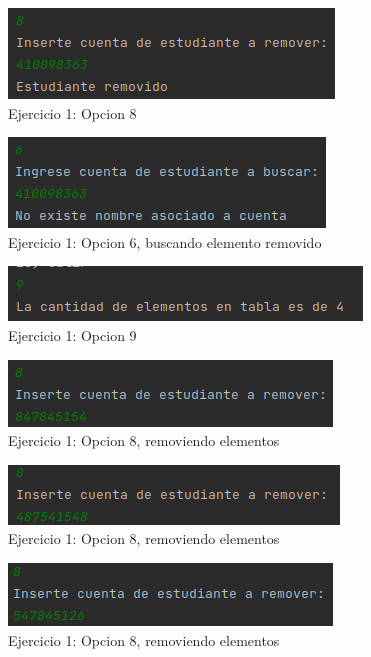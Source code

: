\documentclass{article}
\begin{document}
			\begin{figure}[H]
				\centering
				\includegraphics{images/e114.png}
				\caption*{Ejercicio 1: Opcion 8}
			\end{figure}
			
			\begin{figure}[H]
				\centering
				\includegraphics{images/e115.png}
				\caption*{Ejercicio 1: Opcion 6, buscando elemento removido}
			\end{figure}
			
			\begin{figure}[H]
				\centering
				\includegraphics{images/e116.png}
				\caption*{Ejercicio 1: Opcion 9}
			\end{figure}
			
			\begin{figure}[H]
				\centering
				\includegraphics{images/e117.png}
			\caption*{Ejercicio 1: Opcion 8, removiendo elementos}
			\end{figure}
			
			\begin{figure}[H]
				\centering
				\includegraphics{images/e118.png}
				\caption*{Ejercicio 1: Opcion 8, removiendo elementos}
			\end{figure}
			
			\begin{figure}[H]
				\centering
				\includegraphics{images/e119.png}
				\caption*{Ejercicio 1: Opcion 8, removiendo elementos}
			\end{figure}
			
\end{document}

